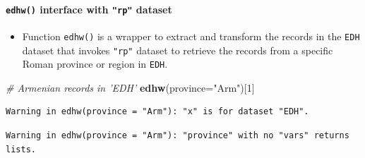 \documentclass[a4paper,11pt]{memoir}
\newenvironment{Shaded}{\begin{snugshade}}{\end{snugshade}}
\newcommand{\CommentTok}[1]{\textcolor[rgb]{0.56,0.35,0.01}{\textit{#1}}}
\newcommand{\DataTypeTok}[1]{\textcolor[rgb]{0.13,0.29,0.53}{#1}}
\newcommand{\DecValTok}[1]{\textcolor[rgb]{0.00,0.00,0.81}{#1}}
\newcommand{\KeywordTok}[1]{\textcolor[rgb]{0.13,0.29,0.53}{\textbf{#1}}}
\newcommand{\NormalTok}[1]{#1}
\newcommand{\StringTok}[1]{\textcolor[rgb]{0.31,0.60,0.02}{#1}}
\providecommand{\tightlist}{%
  \setlength{\itemsep}{0pt}\setlength{\parskip}{0pt}}
\let\oldparagraph\paragraph
\renewcommand{\paragraph}[1]{\oldparagraph{#1}\mbox{}}
\begin{document}
\hypertarget{edhw-interface-with-rp-dataset}{%
\paragraph{\texorpdfstring{\texttt{edhw()} interface with \texttt{"rp"}
dataset}{edhw() interface with "rp" dataset}}\label{edhw-interface-with-rp-dataset}}

\begin{itemize}
\tightlist
\item
  Function \texttt{edhw()} is a wrapper to extract and transform the
  records in the \texttt{EDH} dataset that invokes \texttt{"rp"} dataset
  to retrieve the records from a specific Roman province or region in
  \texttt{EDH}.
\end{itemize}

\begin{Shaded}
\begin{Highlighting}[]
\CommentTok{# Armenian records in 'EDH'}
\KeywordTok{edhw}\NormalTok{(}\DataTypeTok{province=}\StringTok{"Arm"}\NormalTok{)[}\DecValTok{1}\NormalTok{]}
\end{Highlighting}
\end{Shaded}

\begin{verbatim}
Warning in edhw(province = "Arm"): "x" is for dataset "EDH".
\end{verbatim}

\begin{verbatim}
Warning in edhw(province = "Arm"): "province" with no "vars" returns lists.
\end{verbatim}
\end{document}
